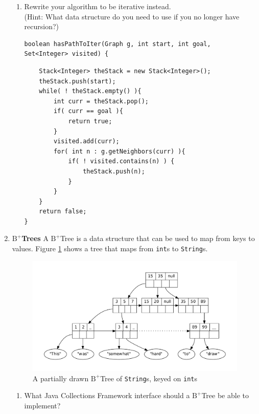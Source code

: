 \documentclass[11pt]{article}
\newenvironment{answer}{\large\lstset{basicstyle=\tiny\ttfamily}\color{white}}{}
\newenvironment{answer}{\large\lstset{basicstyle=\large\ttfamily}\color{red}}{}
\begin{document}
\begin{enumerate}
\begin{enumerate}
		\item
			Rewrite your algorithm to be iterative instead. \\
			(Hint: What data structure do you need to use if you no longer have recursion?)
\begin{verbatim}
boolean hasPathToIter(Graph g, int start, int goal, Set<Integer> visited) {
\end{verbatim}	
			
\begin{answer}
\begin{lstlisting}
	Stack<Integer> theStack = new Stack<Integer>();
	theStack.push(start);
	while( ! theStack.empty() ){
		int curr = theStack.pop();
		if( curr == goal ){
			return true;
		}
		visited.add(curr);
		for( int n : g.getNeighbors(curr) ){
			if( ! visited.contains(n) ) {
				theStack.push(n);
			}
		}
	}
	return false;
}
\end{lstlisting}
\end{answer}
	\end{enumerate}
            
          


\pagebreak
\item{\bf $\textrm{B}^+$Trees} A $\textrm{B}^+$Tree is a data structure that
can be used to map from keys to values. Figure \ref{b-tree} shows a tree that
maps from {\tt int}s to \texttt{String}s.

\begin{figure}[h]
\caption{A partially drawn $\textrm{B}^+$Tree of \texttt{String}s, keyed on \texttt{int}s}
\label{b-tree}
\center
\includegraphics[width=5in]{b_plus_tree_dot.pdf}
\vspace{-1cm}
\end{figure}

    \begin{enumerate}
    \item What Java Collections Framework interface should a
    $\textrm{B}^+$Tree be able to implement?


\end{enumerate}
\end{enumerate}
\end{document}
